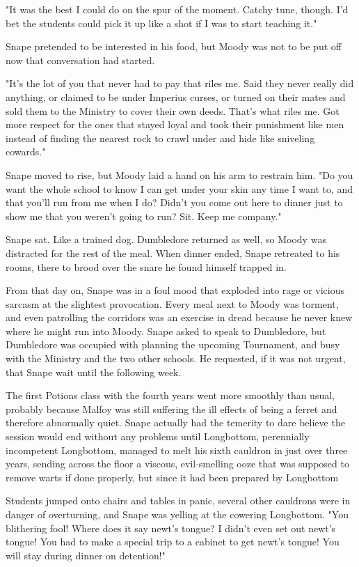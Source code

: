 "It was the best I could do on the spur of the moment. Catchy tune, though. I'd bet the students could pick it up like a shot if I was to start teaching it."

Snape pretended to be interested in his food, but Moody was not to be put off now that conversation had started.

"It's the lot of you that never had to pay that riles me. Said they never really did anything, or claimed to be under Imperius curses, or turned on their mates and sold them to the Ministry to cover their own deeds. That's what riles me. Got more respect for the ones that stayed loyal and took their punishment like men instead of finding the nearest rock to crawl under and hide like sniveling cowards."

Snape moved to rise, but Moody laid a hand on his arm to restrain him. "Do you want the whole school to know I can get under your skin any time I want to, and that you'll run from me when I do? Didn't you come out here to dinner just to show me that you weren't going to run? Sit. Keep me company."

Snape sat. Like a trained dog. Dumbledore returned as well, so Moody was distracted for the rest of the meal. When dinner ended, Snape retreated to his rooms, there to brood over the snare he found himself trapped in.

From that day on, Snape was in a foul mood that exploded into rage or vicious sarcasm at the slightest provocation. Every meal next to Moody was torment, and even patrolling the corridors was an exercise in dread because he never knew where he might run into Moody. Snape asked to speak to Dumbledore, but Dumbledore was occupied with planning the upcoming Tournament, and busy with the Ministry and the two other schools. He requested, if it was not urgent, that Snape wait until the following week.

The first Potions class with the fourth years went more smoothly than usual, probably because Malfoy was still suffering the ill effects of being a ferret and therefore abnormally quiet. Snape actually had the temerity to dare believe the session would end without any problems until Longbottom, perennially incompetent Longbottom, managed to melt his sixth cauldron in just over three years, sending across the floor a viscous, evil-smelling ooze that was supposed to remove warts if done properly, but since it had been prepared by Longbottom{\el}

Students jumped onto chairs and tables in panic, several other cauldrons were in danger of overturning, and Snape was yelling at the cowering Longbottom. "You blithering fool! Where does it say newt's tongue? I didn't even set out newt's tongue! You had to make a special trip to a cabinet to get newt's tongue! You will stay during dinner on detention!"

